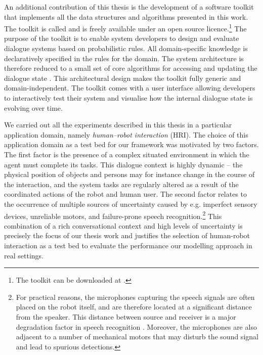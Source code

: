 An additional contribution of this thesis is the development of a software toolkit that implements all the data structures and algorithms presented in this work. The toolkit is called \opendial  and is freely available under an open source licence.\footnote{The toolkit can be downloaded at . } The purpose of the toolkit is to enable system developers to design and evaluate dialogue systems based on probabilistic rules. All domain-specific knowledge is declaratively specified in the rules for the domain. The system architecture is therefore reduced to a small set of core algorithms for accessing and updating the dialogue state \citep{lison-semdial2012}. This architectural design makes the toolkit fully generic and domain-independent. The \opendial toolkit comes with a user interface allowing developers to interactively test their system and visualise how the internal dialogue state is evolving over time.  %

We carried out all the experiments described in this thesis in a particular application domain, namely \textit{human--robot interaction}  (HRI).  The choice of this application domain as a test bed for our framework was motivated by two factors.  The first factor is the presence of a complex situated environment in which the agent must complete its tasks.  This dialogue context is highly dynamic -- the physical position of objects and persons may for instance change in the course of the interaction, and the system tasks are regularly altered as a result of the coordinated actions of the robot and human user. The second factor relates to the occurrence of multiple sources of uncertainty caused by e.g. imperfect sensory devices, unreliable motors, and failure-prone speech recognition.\footnote{For practical reasons, the microphones capturing the speech signals are often placed on the robot itself, and are therefore located at a significant distance from the speaker.  This distance between source and receiver is a major degradation factor in speech recognition \citep{wolfel2009distant}.  Moreover, the microphones are also adjacent to a number of mechanical motors that may disturb the sound signal and lead to spurious detections.} This combination of a rich conversational context and high levels of uncertainty is precisely the focus of our thesis work and justifies the selection of  human-robot interaction as a test bed to evaluate the performance our modelling approach in real settings.


